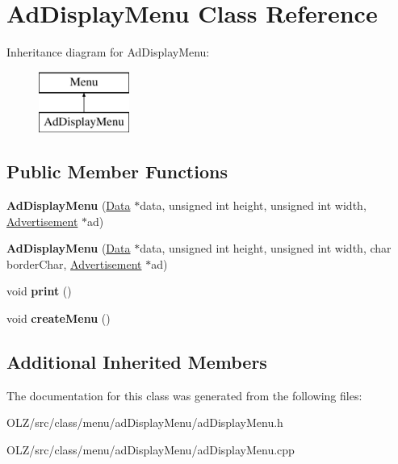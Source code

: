 \hypertarget{class_ad_display_menu}{}\section{Ad\+Display\+Menu Class Reference}
\label{class_ad_display_menu}
Inheritance diagram for Ad\+Display\+Menu\+:\begin{figure}[H]
\begin{center}
\leavevmode
\includegraphics[height=2.000000cm]{class_ad_display_menu}
\end{center}
\end{figure}
\subsection*{Public Member Functions}
\begin{DoxyCompactItemize}
\item 
\hypertarget{class_ad_display_menu_adbdf48ec4ef5e06d7009fc8155ebfe16}{}{\bfseries Ad\+Display\+Menu} (\hyperlink{class_data}{Data} $\ast$data, unsigned int height, unsigned int width, \hyperlink{class_advertisement}{Advertisement} $\ast$ad)\label{class_ad_display_menu_adbdf48ec4ef5e06d7009fc8155ebfe16}

\item 
\hypertarget{class_ad_display_menu_ae8c2f8e2be15fa3d92f243e49f6f1dcd}{}{\bfseries Ad\+Display\+Menu} (\hyperlink{class_data}{Data} $\ast$data, unsigned int height, unsigned int width, char border\+Char, \hyperlink{class_advertisement}{Advertisement} $\ast$ad)\label{class_ad_display_menu_ae8c2f8e2be15fa3d92f243e49f6f1dcd}

\item 
\hypertarget{class_ad_display_menu_acf175cade9d9e5a6d65f1eb901f17a84}{}void {\bfseries print} ()\label{class_ad_display_menu_acf175cade9d9e5a6d65f1eb901f17a84}

\item 
\hypertarget{class_ad_display_menu_ae10113101504905c1cf802085c603a8b}{}void {\bfseries create\+Menu} ()\label{class_ad_display_menu_ae10113101504905c1cf802085c603a8b}

\end{DoxyCompactItemize}
\subsection*{Additional Inherited Members}


The documentation for this class was generated from the following files\+:\begin{DoxyCompactItemize}
\item 
O\+L\+Z/src/class/menu/ad\+Display\+Menu/ad\+Display\+Menu.\+h\item 
O\+L\+Z/src/class/menu/ad\+Display\+Menu/ad\+Display\+Menu.\+cpp\end{DoxyCompactItemize}

